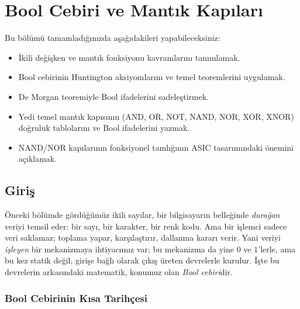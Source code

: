 \chapter{Bool Cebiri ve Mantık Kapıları}
\label{chap:bool-cebri}

\begin{tcolorbox}[
    colback=blokyesil!15,
    colframe=sinyalyesil!60!black,
    title={\textbf{Öğrenme Hedefleri}},
    fonttitle=\bfseries,
    rounded corners,
    boxrule=0.8pt
]
Bu bölümü tamamladığınızda aşağıdakileri yapabileceksiniz:
\begin{itemize}[nosep, leftmargin=*]
    \item İkili değişken ve mantık fonksiyonu kavramlarını tanımlamak.
    \item Bool cebirinin Huntington aksiyomlarını ve temel teoremlerini uygulamak.
    \item De Morgan teoremiyle Bool ifadelerini sadeleştirmek.
    \item Yedi temel mantık kapısının (AND, OR, NOT, NAND, NOR, XOR, XNOR) doğruluk
    tablolarını ve Bool ifadelerini yazmak.
    \item NAND/NOR kapılarının fonksiyonel tamlığının ASIC tasarımındaki önemini açıklamak.
\end{itemize}
\end{tcolorbox}

\section{Giriş}
\label{sec:bool-giris}

Önceki bölümde gördüğümüz ikili sayılar, bir bilgisayarın belleğinde \emph{durağan} veriyi
temsil eder: bir sayı, bir karakter, bir renk kodu. Ama bir işlemci sadece veri saklamaz;
toplama yapar, karşılaştırır, dallanma kararı verir. Yani veriyi \emph{işleyen} bir mekanizmaya
ihtiyacımız var; bu mekanizma da yine $0$ ve $1$'lerle, ama bu kez statik değil, girişe bağlı
olarak çıkış üreten devrelerle kurulur. İşte bu devrelerin arkasındaki matematik, konumuz olan
\emph{Bool cebiri}dir.

\subsection{Bool Cebirinin Kısa Tarihçesi}
\label{sec:bool-tarihce}

